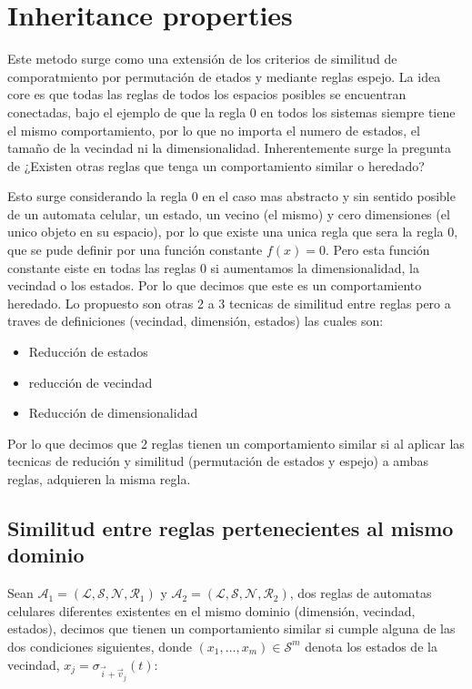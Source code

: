 \section{Inheritance properties}

Este metodo surge como una extensión de los criterios de similitud de comporatmiento por permutación de etados y mediante reglas espejo. La idea core es que todas las reglas de todos los espacios posibles se encuentran conectadas, bajo el ejemplo de que la regla 0 en todos los sistemas siempre tiene el mismo comportamiento, por lo que no importa el numero de estados, el tamaño de la vecindad ni la dimensionalidad. Inherentemente surge la pregunta de ¿Existen otras reglas que tenga un comportamiento similar o heredado?

Esto surge considerando la regla 0 en el caso mas abstracto y sin sentido posible de un automata celular, un estado, un vecino (el mismo) y cero dimensiones (el unico objeto en su espacio), por lo que existe una unica regla que sera la regla 0, que se pude definir por una función constante $f(x) = 0$. Pero esta función constante eiste en todas las reglas 0 si aumentamos la dimensionalidad, la vecindad o los estados. Por lo que decimos que este es un comportamiento heredado. Lo propuesto son otras 2 a 3 tecnicas de similitud entre reglas pero a traves de definiciones (vecindad, dimensión, estados) las cuales son:

\begin{itemize}
	\item Reducción de estados
	\item reducción de vecindad
	\item Reducción de dimensionalidad
\end{itemize}

Por lo que decimos que 2 reglas tienen un comportamiento similar si al aplicar las tecnicas de redución y similitud (permutación de estados y espejo)  a ambas reglas, adquieren la misma regla. 

\subsection{Similitud entre reglas pertenecientes al mismo dominio}

Sean $\mathcal{A}_1 = (\mathcal{L}, \mathcal{S}, \mathcal{N}, \mathcal{R}_1)$ y $\mathcal{A}_2 = (\mathcal{L}, \mathcal{S}, \mathcal{N}, \mathcal{R}_2)$, dos reglas de automatas celulares diferentes existentes en el mismo dominio (dimensión, vecindad, estados), decimos que tienen un comportamiento similar si cumple alguna de las dos condiciones siguientes, donde $(x_1, \dots, x_m) \in \mathcal{S}^m$ denota los estados de la vecindad, $x_j = \sigma_{\vec{i} + \vec{v}_j}(t)$:

